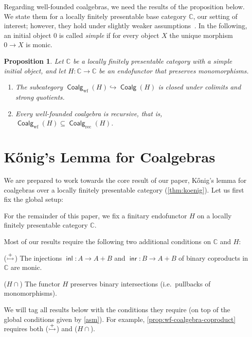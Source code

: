 \documentclass[10pt,a4paper]{article}
\newtheorem{proposition}[theorem]{Proposition}
\theoremstyle{definition}
\theoremstyle{remark}
\numberwithin{equation}{section}
\providecommand{\oname}[1]{{\mathop{\mathsf{#1}}\xspace}}
\newcommand{\Konig}{Kőnig}
\providecommand{\inl}{\oname{inl}}
\providecommand{\inr}{\oname{inr}}
\newcommand{\lfplong}{locally finitely presentable\xspace}
\newcommand{\lfp}{\lfplong}
\newcommand{\seq}{\subseteq}
\providecommand{\C}{}
\newcommand{\rec}{{\mathrm{rec}}}
\newcommand{\wf}{{\mathrm{wf}}}
\renewcommand{\C}{{\mathbb{C}}}
\DeclareMathOperator{\Coalg}{\mathsf{Coalg}}
\newcommand{\subto}{\hookrightarrow}
\newcommand{\injmono}{\ensuremath{\overset{\smash{\raisebox{-1pt}{\ensuremath{\scriptstyle+}}}}{\rightarrowtail}}}\newcommand{\hpresint}{\ensuremath{H\cap}\xspace}
\theoremstyle{plain}
\theoremstyle{definition}
\begin{document}
Regarding well-founded coalgebras, we need the results of the proposition below. We state them for a \lfp base category $\C$, our setting of interest; however, they hold under slightly weaker assumptions~\cite[Cor.~8.4.3, Thm.~8.5.3]{amm25}. In the following, an initial object $0$ is called \emph{simple} if for every object $X$ the unique morphism $0\to X$ is monic.


\begin{proposition}\label{prop:wf} 
Let $\C$ be a \lfp category with a simple initial object, and let $H\colon \C\to \C$ be an endofunctor that preserves monomorphisms.
\begin{enumerate}
\item\label{prop:wf:closed-colim-quotients} The subcategory $\Coalg_\wf(H)\subto \Coalg(H)$ is closed under colimits and strong quotients.
\item\label{prop:wf:wf-to-rec} Every well-founded coalgebra is recursive, that is, $\Coalg_\wf(H)\seq \Coalg_\rec(H)$.
\end{enumerate}
\end{proposition}








\section{\Konig's Lemma for Coalgebras}\label{sec:konig}
We are prepared to work towards the core result of our paper, \Konig's lemma for coalgebras over a \lfp category (\autoref{thm:koenig}). Let us first fix the global setup:

\begin{assumption}\label{asm}
For the remainder of this paper, we fix a finitary endofunctor $H$ on a \lfplong category $\C$. 
\end{assumption}
Most of our results require the following two additional conditions on $\C$ and $H$:

\medskip\noindent (\injmono) The injections $\inl\colon A\to A+B$ and $\inr\colon B\to A+B$ of binary coproducts in $\C$ are monic.

\medskip\noindent (\hpresint) The functor $H$ preserves binary intersections (i.e.\ pullbacks of monomorphisms).

\medskip\noindent We will tag all results below with the conditions they require (on top of the global conditions given by \autoref{asm}). For example, \autoref{prop:wf-coalgebra-coproduct} requires both (\injmono) and (\hpresint).
\end{document}
